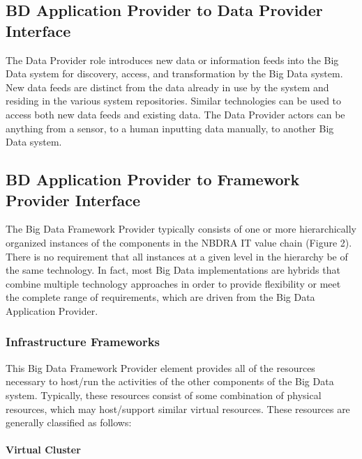 \documentclass[11pt]{article}
\begin{document}
\subsection{BD Application Provider to Data Provider Interface}

The Data Provider role introduces new data or information feeds into the Big Data system for discovery, 
access, and transformation by the Big Data system. New data feeds are distinct from the data already in 
use by the system and residing in the various system repositories. Similar technologies can be used to 
access both new data feeds and existing data. The Data Provider actors can be anything from a sensor, to 
a human inputting data manually, to another Big Data system.

\subsection{BD Application Provider to Framework Provider
Interface}


The Big Data Framework Provider typically consists of one or more hierarchically organized instances of 
the components in the NBDRA IT value chain (Figure 2). There is no requirement that all instances at a 
given level in the hierarchy be of the same technology. In fact, most Big Data implementations are 
hybrids that combine multiple technology approaches in order to provide flexibility or meet the complete 
range of requirements, which are driven from the Big Data Application Provider. 

\subsubsection{Infrastructure Frameworks}

This Big Data Framework Provider element provides all of the resources necessary to host/run the 
activities of the other components of the Big Data system. Typically, these resources consist of some 
combination of physical resources, which may host/support similar virtual resources. These resources are 
generally classified as follows:

\paragraph{Virtual Cluster}

\begin{quote}

\end{quote}
\end{document}
